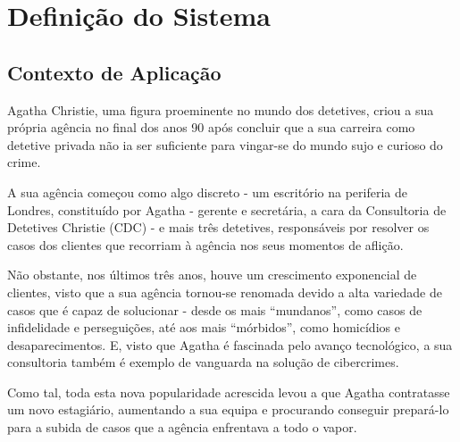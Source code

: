 \documentclass[a4paper,12pt]{scrreprt}
\begin{document}
\tableofcontents

\pagebreak

\listoffigures

\pagebreak

\listoftables

\pagebreak




\chapter{Definição do Sistema}
    \section{Contexto de Aplicação}
    Agatha Christie, uma figura proeminente no mundo dos detetives, criou a sua própria agência
    no final dos anos 90 após concluir que a sua carreira como detetive privada não ia ser
    suficiente para vingar-se do mundo sujo e curioso do crime.

    A sua agência começou como algo discreto - um escritório na periferia de Londres,
    constituído por Agatha - gerente e secretária, a cara da Consultoria de Detetives Christie
    (CDC) - e mais três detetives, responsáveis por resolver os casos dos clientes que recorriam
    à agência nos seus momentos de aflição.
    
    Não obstante, nos últimos três anos, houve um crescimento exponencial de clientes, visto que a
    sua agência tornou-se renomada devido a alta variedade de casos que é capaz de solucionar -
    desde os mais “mundanos”, como casos de infidelidade e perseguições, até aos mais
    “mórbidos”, como homicídios e desaparecimentos. E, visto que Agatha é fascinada pelo avanço
    tecnológico, a sua consultoria também é exemplo de vanguarda na solução de cibercrimes.
    
    Como tal, toda esta nova popularidade acrescida levou a que Agatha contratasse um novo
    estagiário, aumentando a sua equipa e procurando conseguir prepará-lo para a subida de
    casos que a agência enfrentava a todo o vapor.
\end{document}
